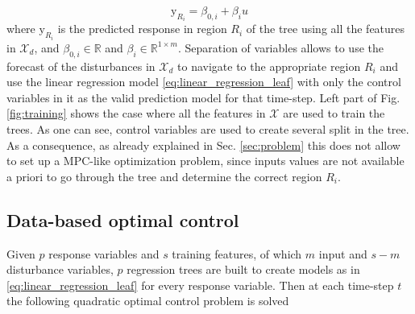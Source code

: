 \textcolor[rgb]{0.00,0.00,1.00}{\begin{equation}\label{eq:linear_regression_leaf}
\mathrm{y}_{R_i} = \beta_{0,i} + \beta_i u
\end{equation}
where $\mathrm{y}_{R_i}$ is the predicted response in region $R_i$ of the tree using all the features in $\mathcal{X}_d$, and $\beta_{0,i}\in\mathbb{R}$ and $\beta_i\in\mathbb{R}^{1\times m}$. Separation of variables allows to use the forecast of the disturbances in $\mathcal{X}_d$ to navigate to the appropriate region $R_i$ and use the linear regression model \eqref{eq:linear_regression_leaf} with only the control variables in it as the valid prediction model for that time-step. Left part of Fig. \ref{fig:training} shows the case where all the features in $\mathcal{X}$ are used to train the trees. As one can see, control variables are used to create several split in the tree. As a consequence, as already explained in Sec. \ref{sec:problem} this does not allow to set up a MPC-like optimization problem, since inputs values are not available a priori to go through the tree and determine the correct region $R_i$.}

\subsection{Data-based optimal control}
\textcolor[rgb]{0.00,0.00,1.00}{Given $p$ response variables and $s$ training features, of which $m$ input and $s-m$ disturbance variables, $p$ regression trees are built to create models as in \eqref{eq:linear_regression_leaf} for every response variable. Then at each time-step $t$ the following quadratic optimal control problem is solved}

